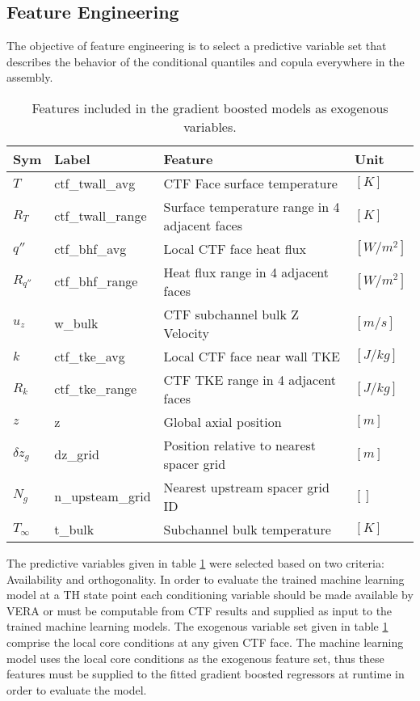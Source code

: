 \subsection{Feature Engineering}
\label{sec:feature_eng}

The objective of feature engineering is to select a predictive variable set that describes the behavior of the conditional quantiles and copula everywhere in the assembly.

\begin{table}[h]
    \begin{center}
    \caption[Included exogenous training features.]{Features included in the gradient boosted models as exogenous variables.}
\begin{tabular}[h]{|l | l | l | l |}
    \hline
    Sym & Label & Feature & Unit \\
    \hline
    \hline
    $T$ & ctf\_twall\_avg & CTF Face surface temperature & $[K]$ \\
    $R_T$ & ctf\_twall\_range & Surface temperature range in 4 adjacent faces & $[K]$ \\
    $q''$ & ctf\_bhf\_avg & Local CTF face heat flux & $[W/m^2]$ \\
    $R_{q''}$ & ctf\_bhf\_range & Heat flux range in 4 adjacent faces & $[W/m^2]$ \\
    $u_z$ & w\_bulk & CTF subchannel bulk Z Velocity &  $[m/s]$ \\
    $k$ & ctf\_tke\_avg & Local CTF face near wall TKE &  $[J/kg]$ \\
    $R_k$ & ctf\_tke\_range & CTF TKE range in 4 adjacent faces & $[J/kg]$ \\
    $z$ & z & Global axial position & $[m]$ \\
    $\delta z_g$ & dz\_grid & Position relative to nearest spacer grid & $[m]$ \\
    $N_g$ & n\_upsteam\_grid  & Nearest upstream spacer grid ID & $[]$ \\
    $T_\infty$ & t\_bulk & Subchannel bulk temperature  &  $[K]$ \\
    \hline
\end{tabular}
\label{tab:features}
\end{center}
\end{table}

The predictive variables given in table \ref{tab:features} were selected based on two criteria:  Availability and orthogonality.  In order to evaluate the trained machine learning model at a TH state point each conditioning variable should be made available by VERA or must be computable from CTF results and supplied as input to the trained machine learning models.   The exogenous variable set given in table \ref{tab:features} comprise the local core conditions at any given CTF face.  The machine learning model uses the local core conditions as the exogenous feature set, thus these features must be supplied to the fitted gradient boosted regressors at runtime in order to evaluate the model.

